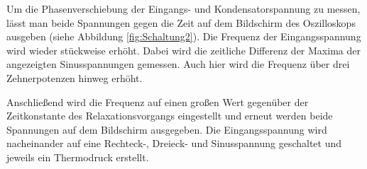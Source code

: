 Um die Phasenverschiebung der Eingangs- und Kondensatorspannung zu messen,
lässt man beide Spannungen gegen die Zeit auf dem Bildschirm des Oszilloskops ausgeben (siehe Abbildung \ref{fig:Schaltung2}).
Die Frequenz der Eingangsspannung wird wieder stückweise erhöht. Dabei wird
die zeitliche Differenz der Maxima der angezeigten Sinusspannungen gemessen.
Auch hier wird die Frequenz über drei Zehnerpotenzen hinweg erhöht.

Anschließend wird die Frequenz auf einen großen Wert gegenüber der Zeitkonstante
des Relaxationsvorgangs eingestellt und erneut werden beide Spannungen auf dem
Bildschirm ausgegeben. Die Eingangsspannung wird nacheinander auf eine Rechteck-, Dreieck-
und Sinusspannung geschaltet und jeweils ein Thermodruck erstellt.
